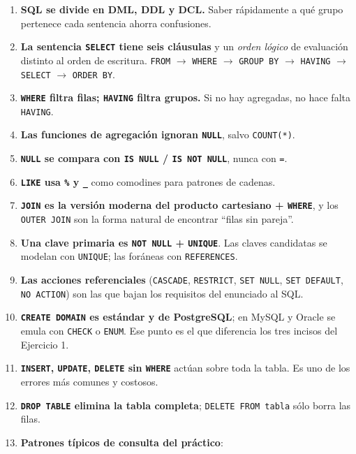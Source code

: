 \documentclass[11pt,a4paper]{article}
\begin{document}
\begin{enumerate}
    \item \textbf{SQL se divide en DML, DDL y DCL.} Saber rápidamente a qué
    grupo pertenece cada sentencia ahorra confusiones.
    \item \textbf{La sentencia \texttt{SELECT} tiene seis cláusulas} y un
    \emph{orden lógico} de evaluación distinto al orden de escritura.
    \texttt{FROM} $\to$ \texttt{WHERE} $\to$ \texttt{GROUP BY} $\to$
    \texttt{HAVING} $\to$ \texttt{SELECT} $\to$ \texttt{ORDER BY}.
    \item \textbf{\texttt{WHERE} filtra filas; \texttt{HAVING} filtra grupos.}
    Si no hay agregadas, no hace falta \texttt{HAVING}.
    \item \textbf{Las funciones de agregación ignoran \texttt{NULL}}, salvo
    \texttt{COUNT(*)}.
    \item \textbf{\texttt{NULL} se compara con \texttt{IS NULL} / \texttt{IS
    NOT NULL}}, nunca con \texttt{=}.
    \item \textbf{\texttt{LIKE} usa \texttt{\%} y \texttt{\_}} como
    comodines para patrones de cadenas.
    \item \textbf{\texttt{JOIN} es la versión moderna del producto cartesiano
    + \texttt{WHERE}}, y los \texttt{OUTER JOIN} son la forma natural de
    encontrar ``filas sin pareja''.
    \item \textbf{Una clave primaria es \texttt{NOT NULL} + \texttt{UNIQUE}}.
    Las claves candidatas se modelan con \texttt{UNIQUE}; las foráneas con
    \texttt{REFERENCES}.
    \item \textbf{Las acciones referenciales} (\texttt{CASCADE},
    \texttt{RESTRICT}, \texttt{SET NULL}, \texttt{SET DEFAULT},
    \texttt{NO ACTION}) son las que bajan los requisitos del enunciado al
    SQL.
    \item \textbf{\texttt{CREATE DOMAIN} es estándar y de PostgreSQL}; en
    MySQL y Oracle se emula con \texttt{CHECK} o \texttt{ENUM}. Ese punto
    es el que diferencia los tres incisos del Ejercicio 1.
    \item \textbf{\texttt{INSERT}, \texttt{UPDATE}, \texttt{DELETE} sin
    \texttt{WHERE}} actúan sobre toda la tabla. Es uno de los errores más
    comunes y costosos.
    \item \textbf{\texttt{DROP TABLE} elimina la tabla completa};
    \texttt{DELETE FROM tabla} sólo borra las filas.
    \item \textbf{Patrones típicos de consulta del práctico}:
    \begin{itemize}

\end{itemize}
\end{enumerate}
\end{document}
